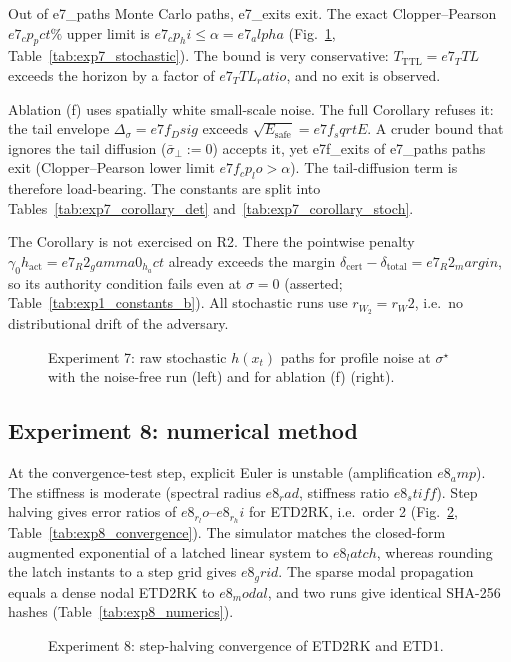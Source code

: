 Out of {{e7_paths}} Monte Carlo paths, {{e7_exits}} exit. The exact Clopper--Pearson \({{e7_cp_pct}}\%\) upper limit is
\({{e7_cp_hi}} \le \alpha = {{e7_alpha}}\) (Fig.~\ref{fig:exp7}, Table~\ref{tab:exp7_stochastic}). The bound is very
conservative: \(T_{\mathrm{TTL}} = {{e7_TTL}}\) exceeds the horizon by a factor of \({{e7_TTL_ratio}}\), and no exit is
observed.

Ablation (f) uses spatially white small-scale noise. The full Corollary refuses it: the tail envelope
\(\Delta_\sigma = {{e7f_Dsig}}\) exceeds \(\sqrt{E_{\mathrm{safe}}} = {{e7f_sqrtE}}\). A cruder bound that ignores the tail
diffusion (\(\bar\sigma_\perp := 0\)) accepts it, yet {{e7f_exits}} of {{e7_paths}} paths exit (Clopper--Pearson lower
limit \({{e7f_cp_lo}} > \alpha\)). The tail-diffusion term is therefore load-bearing. The constants are split into
Tables~\ref{tab:exp7_corollary_det} and~\ref{tab:exp7_corollary_stoch}.

The Corollary is not exercised on R2. There the pointwise penalty \(\gamma_0h_{\mathrm{act}} = {{e7_R2_gamma0_h_act}}\)
already exceeds the margin \(\delta_{\mathrm{cert}} - \delta_{\mathrm{total}} = {{e7_R2_margin}}\), so its authority condition
fails even at \(\sigma = 0\) (asserted; Table~\ref{tab:exp1_constants_b}). All stochastic runs use \(r_{W_{\scriptstyle 2}} = {{r_W2}}\),
i.e.\ no distributional drift of the adversary.

\begin{figure}[t]\centering{}
\caption{Experiment 7: raw stochastic \(h(x_t)\) paths for profile noise at \(\sigma^\star\) with the noise-free run (left)
and for ablation (f) (right).}\label{fig:exp7}\end{figure}





\subsection{Experiment 8: numerical method}
At the convergence-test step, explicit Euler is unstable (amplification \({{e8_amp}}\)). The stiffness is moderate
(spectral radius \({{e8_rad}}\), stiffness ratio \({{e8_stiff}}\)). Step halving gives error ratios of
\({{e8_r_lo}}\)--\({{e8_r_hi}}\) for ETD2RK, i.e.\ order 2 (Fig.~\ref{fig:exp8}, Table~\ref{tab:exp8_convergence}).
The simulator matches the closed-form augmented exponential of a latched linear system to \({{e8_latch}}\), whereas
rounding the latch instants to a step grid gives \({{e8_grid}}\). The sparse modal propagation equals a dense nodal
ETD2RK to \({{e8_modal}}\), and two runs give identical SHA-256 hashes (Table~\ref{tab:exp8_numerics}).

\begin{figure}[t]\centering{}
\caption{Experiment 8: step-halving convergence of ETD2RK and ETD1.}\label{fig:exp8}\end{figure}



